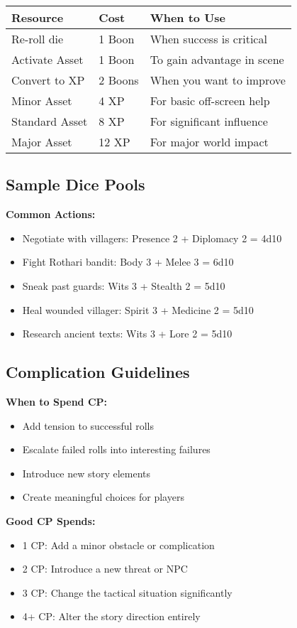 \documentclass[11pt]{article}
\begin{document}
\begin{tabular}{|l|l|l|}
\hline
\textbf{Resource} & \textbf{Cost} & \textbf{When to Use} \\
\hline
Re-roll die & 1 Boon & When success is critical \\
Activate Asset & 1 Boon & To gain advantage in scene \\
Convert to XP & 2 Boons & When you want to improve \\
Minor Asset & 4 XP & For basic off-screen help \\
Standard Asset & 8 XP & For significant influence \\
Major Asset & 12 XP & For major world impact \\
\hline
\end{tabular}

\subsection{Sample Dice Pools}

\textbf{Common Actions:}
\begin{itemize}
\item Negotiate with villagers: Presence 2 + Diplomacy 2 = 4d10
\item Fight Rothari bandit: Body 3 + Melee 3 = 6d10
\item Sneak past guards: Wits 3 + Stealth 2 = 5d10
\item Heal wounded villager: Spirit 3 + Medicine 2 = 5d10
\item Research ancient texts: Wits 3 + Lore 2 = 5d10
\end{itemize}

\subsection{Complication Guidelines}

\textbf{When to Spend CP:}
\begin{itemize}
\item Add tension to successful rolls
\item Escalate failed rolls into interesting failures
\item Introduce new story elements
\item Create meaningful choices for players
\end{itemize}

\textbf{Good CP Spends:}
\begin{itemize}
\item 1 CP: Add a minor obstacle or complication
\item 2 CP: Introduce a new threat or NPC
\item 3 CP: Change the tactical situation significantly
\item 4+ CP: Alter the story direction entirely
\end{itemize}
\end{document}
